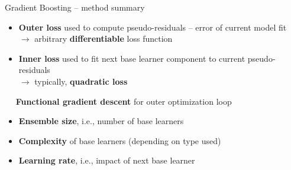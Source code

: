 \begin{frame}{Gradient Boosting -- method summary}

\footnotesize


\begin{itemize}
  \item \textbf{Outer loss} used to compute pseudo-residuals -- error of 
  current model fit \\
  $\rightarrow$ arbitrary \textbf{differentiable} loss function
  \item \textbf{Inner loss} used to fit next base learner component to 
  current pseudo-residuals \\
  $\rightarrow$ typically, \textbf{quadratic loss}
\end{itemize}

\medskip

 ~~ \textbf{Functional gradient descent} for outer 
optimization loop

\medskip


\begin{itemize}
  \item \textbf{Ensemble size}, i.e., number of base learners
  \item \textbf{Complexity} of base learners (depending on type used)
  \item \textbf{Learning rate}, i.e., impact of next base learner
\end{itemize}

\medskip


\end{frame}


